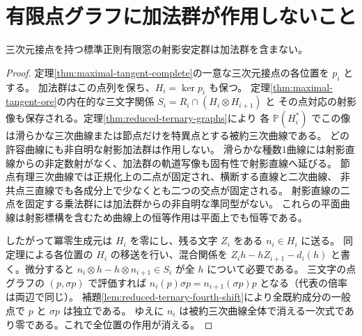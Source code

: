 \section{有限点グラフに加法群が作用しないこと}
\label{sec:finite-unipotent-exclusion}
\begin{lemma}\label{lem:maximal-tangent-no-additive}
三次元接点を持つ標準正則有限窓の射影安定群は加法群を含まない。
\end{lemma}
\begin{proof}
定理\ref{thm:maximal-tangent-complete}の一意な三次元接点の各位置を $p_i$ とする。
加法群はこの点列を保ち、$H_i=\ker p_i$ も保つ。
定理\ref{thm:maximal-tangent-ore}の内在的な三文字関係 $S_i=R_i\cap(H_i\otimes H_{i+1})$ と
その点対応の射影像も保存される。定理\ref{thm:reduced-ternary-graphs}により
各 $\mathbb P(H_i^*)$ でこの像は滑らかな三次曲線または節点だけを特異点とする被約三次曲線である。
どの許容曲線にも非自明な射影加法群は作用しない。
滑らかな種数1曲線には射影直線からの非定数射がなく、加法群の軌道写像も固有性で射影直線へ延びる。
節点有理三次曲線では正規化上の二点が固定され、横断する直線と二次曲線、
非共点三直線でも各成分上で少なくとも二つの交点が固定される。
射影直線の二点を固定する乗法群には加法群からの非自明な準同型がない。
これらの平面曲線は射影標構を含むため曲線上の恒等作用は平面上でも恒等である。

したがって冪零生成元は $H_i$ を零にし、残る文字 $Z_i$ をある $n_i\in H_i$ に送る。
同定理による各位置の $H_i$ の移送を行い、混合関係を
$Z_i h-h Z_{i+1}-d_i(h)$ と書く。微分すると
$n_i\otimes h-h\otimes n_{i+1}\in S_i$ が全 $h$ について必要である。
三文字の点グラフの $(p,\sigma p)$ で評価すれば
$n_i(p)\sigma p=n_{i+1}(\sigma p)p$ となる（代表の倍率は両辺で同じ）。
補題\ref{lem:reduced-ternary-fourth-shift}により全既約成分の一般点で $p$ と $\sigma p$ は独立である。
ゆえに $n_i$ は被約三次曲線全体で消える一次式であり零である。これで全位置の作用が消える。
\end{proof}

